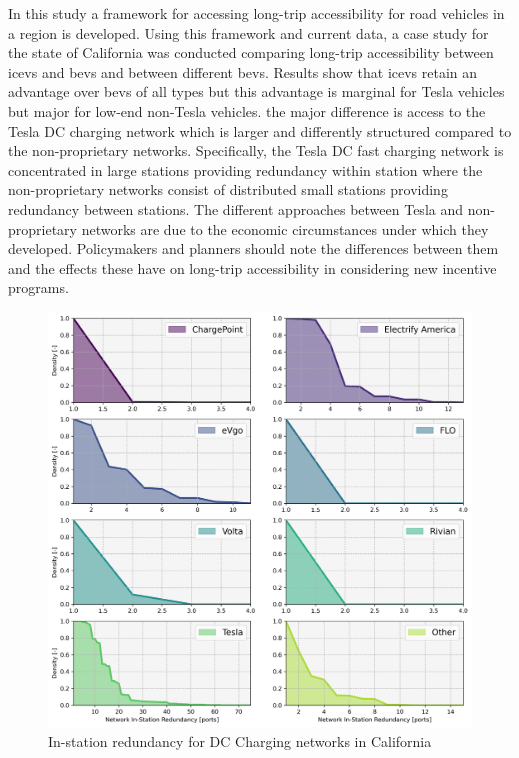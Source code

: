 \documentclass[11pt]{article}
\begin{document}
\begin{multicols}{2}
In this study a framework for accessing long-trip accessibility for road vehicles in a region is developed. Using this framework and current data, a case study for the state of California was conducted comparing long-trip accessibility between \glspl{icev} and \glspl{bev} and between different \glspl{bev}. Results show that \glspl{icev} retain an advantage over \glspl{bev} of all types but this advantage is marginal for Tesla vehicles but major for low-end non-Tesla vehicles. the major difference is access to the Tesla DC charging network which is larger and differently structured compared to the non-proprietary networks. Specifically, the Tesla DC fast charging network is concentrated in large stations providing redundancy within station where the non-proprietary networks consist of distributed small stations providing redundancy between stations. The different approaches between Tesla and non-proprietary networks are due to the economic circumstances under which they developed. Policymakers and planners should note the differences between them and the effects these have on long-trip accessibility in considering new incentive programs.


 

\newpage

\printbibliography

\appendix

\begin{figure}[H]
	\centering
	\includegraphics[width = \linewidth]{figs/California_RIS_SF_All_Pres.png}
	\caption{In-station redundancy for DC Charging networks in California}
	\label{fig:ris_top_8_networks}
\end{figure}


\end{multicols}
\end{document}
